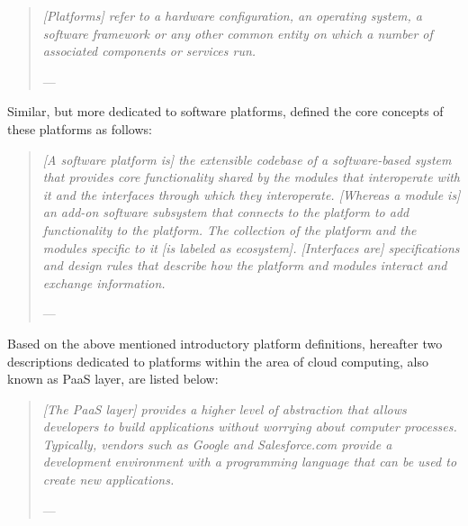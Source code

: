 \begin{quotation}{\slshape 
[Platforms] refer to a hardware configuration, an operating system, a software framework or any other common entity on which a number of associated components or services run.}
\vspace*{-7pt}
\begin{flushright}
	--- \citealp[p. 88]{Poel2007}
\end{flushright}
\end{quotation}

Similar, but more dedicated to software platforms, \citet{Tiwana2010} defined the core concepts of these platforms as follows:

\begin{quotation}{\slshape 
[A software platform is] the extensible codebase of a software-based system that provides core functionality shared by the modules that interoperate with it and the interfaces through which they interoperate. [Whereas a module is] an add-on software subsystem that connects to the platform to add functionality to the platform. The collection of the platform and the modules specific to it [is labeled as ecosystem]. [Interfaces are] specifications and design rules that describe how the platform and modules interact and exchange information.}
\vspace*{-7pt}
\begin{flushright}
	--- \citealp[p. 676]{Tiwana2010}
\end{flushright}
\end{quotation}

Based on the above mentioned introductory platform definitions, hereafter two descriptions dedicated to platforms within the area of cloud computing, also known as \ac{PaaS} layer, are listed below:

\begin{quotation}{\slshape 
[The \ac{PaaS} layer] provides a higher level of abstraction that allows developers to build applications without worrying about computer processes. Typically, vendors such as Google and Salesforce.com provide a development environment with a programming language that can be used to create new applications.}
\vspace*{-7pt}
\begin{flushright}
	--- \citealp[p. 118]{Iyer2010}
\end{flushright}
\end{quotation}

